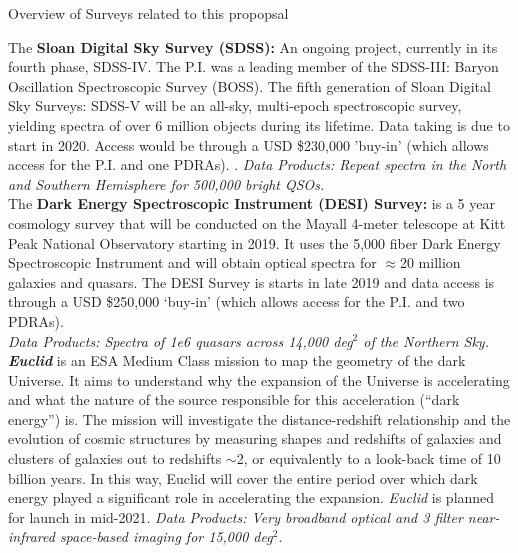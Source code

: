 \documentclass[oneside, a4paper, onecolumn, 11pt]{article}
\begin{document}
\begin{framed}
\begin{tcolorbox}
\begin{center}
  Overview of Surveys related to this propopsal
\end{center}
\end{tcolorbox}

The {\bf Sloan Digital Sky Survey (SDSS):} An ongoing project, currently in its fourth phase, SDSS-IV.  
The P.I. was a leading member of the SDSS-III: Baryon Oscillation Spectroscopic Survey (BOSS). 
The fifth generation of Sloan Digital Sky Surveys: SDSS-V will be an all-sky, multi-epoch spectroscopic 
survey, yielding spectra of over 6 million objects during its lifetime. Data taking is due to start in 
2020. Access would be through a USD \$230,000 'buy-in' (which allows access for the P.I. and one PDRAs).  . 
{\it Data Products: Repeat spectra in the North and Southern Hemisphere for 500,000 bright QSOs.} \\

The {\bf Dark Energy Spectroscopic Instrument (DESI) Survey:} is a 5 year cosmology survey 
that will be conducted on the Mayall 4-meter telescope at Kitt Peak National Observatory starting 
in 2019. It uses the 5,000 fiber Dark Energy Spectroscopic Instrument and will obtain optical 
spectra for $\approx$20 million galaxies and quasars. The DESI Survey is starts in late 2019 
and data access is through a USD \$250,000 `buy-in' (which allows access for the P.I. and two PDRAs).  \\
{\it Data Products: Spectra of 1e6 quasars across 14,000 deg$^{2}$ of the Northern Sky.} \\

\textit{\textbf{Euclid}} is an ESA Medium Class mission to map the geometry of the dark Universe.
It aims to understand why the expansion of the Universe is accelerating and what the nature 
of the source responsible for this acceleration (``dark energy'') is. 
The
mission will investigate the distance-redshift relationship and the
evolution of cosmic structures by measuring shapes and redshifts of
galaxies and clusters of galaxies out to redshifts $\sim$2, or equivalently
to a look-back time of 10 billion years. In this way, Euclid will
cover the entire period over which dark energy played a significant
role in accelerating the expansion.
{\it Euclid} is planned for launch in mid-2021. 
{\it Data Products: Very broadband optical and 3 filter near-infrared space-based imaging for 15,000 deg$^2$.} \\


\end{framed}
\end{document}

